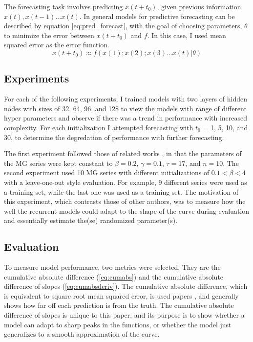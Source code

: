 \documentclass[11pt]{article}
\begin{document}
The forecasting task involves predicting $x(t+t_0)$, given previous
information $x(t), x(t-1) ... x(t)$. In general models for predictive forecasting
can be described by equation \ref{eq:pred_forecast}, with the goal of
choosing parameters, $\theta$ to minimize the error between $x(t+t_0)$
and $f$. In this case, I used mean squared error as the error function.
\begin{equation}
  x(t+t_0) \approx f(x(1);x(2);x(3)...x(t) | \theta)
  \label{eq:pred_forecast}
\end{equation}

\subsection{Experiments}
For each of the following
experiments, I
trained models with two layers of hidden nodes with sizes of 32, 64, 96, and 128 to
view the models with range of different hyper parameters and observe if
there was a trend in performance with increased complexity. For each
initialization I attempted forecasting with $t_0$ = 1, 5, 10, and 30,
to determine the degredation of performance with further forecasting.

The first experiment followed those of related works \cite{tr, Farsa}, in that the
parameters of the MG series were kept constant to $\beta = 0.2$,
$\gamma = 0.1$, $\tau = 17$, and $n = 10$. The second experiment used 10 MG series with different
initializations of $0.1 < \beta < 4$ with a leave-one-out style
evaluation. For example, 9 different series were used as a training
set, while the last one was used as a training set. The motivation of
this experiment, which contrasts those of other authors, was to measure
how the well the recurrent models could adapt to the shape of the curve during
evaluation and essentially estimate the(se) randomized parameter(s).

\subsection{Evaluation}
To measure model performance, two metrics were selected. They are
the cumulative absolute difference (\ref{eq:cumabs}) and the
cumulative absolute difference of slopes
(\ref{eq:cumabsderiv}). The cumulative absolute difference, which is
equivalent to square root mean squared error, is used 
papers \cite{Farsa}, and generally shows how far off each prediction
is from the truth. The cumulative absolute difference of slopes is
unique to this paper, and its purpose is to show whether a model can
adapt to sharp peaks in the functions, or whether the model just
generalizes to a smooth approximation of the curve.
\end{document}

